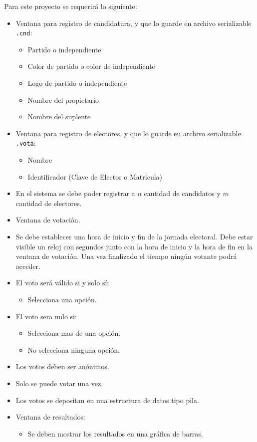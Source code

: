 \documentclass[11pt]{article}
\begin{document}
Para este proyecto se requerirá lo siguiente:
\begin{itemize}
\item Ventana para registro de candidatura, y que lo guarde en archivo serializable \texttt{.cnd}:
\begin{itemize}
\item Partido o independiente
\item Color de partido o color de independiente
\item Logo de partido o independiente
\item Nombre del propietario
\item Nombre del suplente
\end{itemize}
\item Ventana para registro de electores, y que lo guarde en archivo serializable \texttt{.vota}:
\begin{itemize}
\item Nombre
\item Identificador (Clave de Elector o Matricula)
\end{itemize}
\item En el sistema se debe poder registrar a $n$ cantidad de candidatos y $m$ cantidad de electores.
\item Ventana de votación.
\item  Se debe establecer una hora de inicio y fin de la jornada electoral. Debe estar visible un reloj con segundos junto con la hora de inicio y la hora de fin en la ventana de votación. Una vez finalizado el tiempo ningún votante podrá acceder.
\item El voto será válido si y solo sí:
\begin{itemize}
\item Selecciona una opción.
\end{itemize}
\item El voto sera nulo si:
\begin{itemize}
\item Selecciona mas de una opción.
\item No selecciona ninguna opción. 
\end{itemize}
\item Los votos deben ser anónimos.
\item Solo se puede votar una vez.
\item Los votos se depositan en una estructura de datos tipo pila.
\item Ventana de resultados:
\begin{itemize}
\item Se deben mostrar los resultados en una gráfica de barras.

\end{itemize}
\end{itemize}
\end{document}
